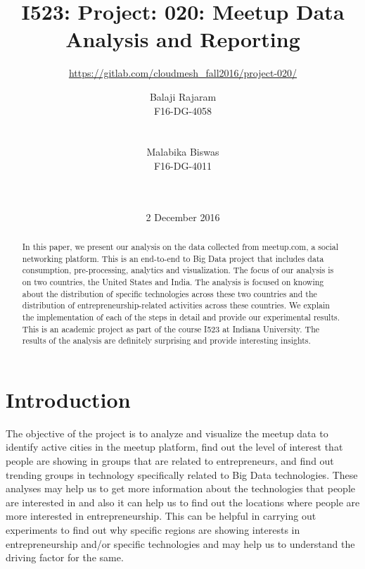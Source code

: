 \documentclass{acm_proc_article-sp}
\begin{document}
\title{I523: Project: 020: Meetup Data Analysis and Reporting}

\subtitle{\url{https://gitlab.com/cloudmesh_fall2016/project-020/}}

\author{
\alignauthor
Balaji Rajaram\\
F16-DG-4058\\
       \\
       \\
\alignauthor
Malabika Biswas\\
F16-DG-4011\\
       \\
       \\
}

\date{2 December 2016}


\maketitle
\begin{abstract}
In this paper, we present our analysis on the data collected from meetup.com\cite{www-meetup}, a social networking platform.  This is an end-to-end to Big Data project that includes data consumption, pre-processing, analytics and visualization.  The focus of our analysis is on two countries, the United States and India.  The analysis is focused on knowing about the distribution of specific technologies across these two countries and the distribution of entrepreneurship-related activities across these countries.  We explain the implementation of each of the steps in detail and provide our experimental results.  This is an academic project as part of the course I523 at Indiana University. The results of the analysis are definitely surprising and provide interesting insights.
\end{abstract}

\section{Introduction}
The objective of the project is to analyze and visualize the meetup data to identify active cities in the meetup platform, find out the level of interest that people are showing in groups that are related to entrepreneurs, and find out trending groups in technology specifically related to Big Data technologies.  These analyses may help us to get more information about the technologies that people are interested in and also it can help us to find out the locations where people are more interested in entrepreneurship.  This can be helpful in carrying out experiments to find out why specific regions are showing interests in entrepreneurship and/or specific technologies and may help us to understand the driving factor for the same.
\end{document}
